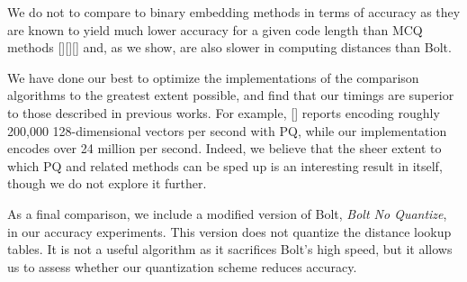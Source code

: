 
We do not to compare to binary embedding methods in terms of accuracy as they are known to yield much lower accuracy for a given code length than MCQ methods [][][] and, as we show, are also slower in computing distances than Bolt. %

We have done our best to optimize the implementations of the comparison algorithms to the greatest extent possible, and find that our timings are superior to those described in previous works. For example, [] reports encoding roughly 200,000 128-dimensional vectors per second with PQ, while our implementation encodes over 24 million per second. Indeed, we believe that the sheer extent to which PQ and related methods can be sped up is an interesting result in itself, though we do not explore it further.

As a final comparison, we include a modified version of Bolt, \textit{Bolt No Quantize}, in our accuracy experiments. This version does not quantize the distance lookup tables. It is not a useful algorithm as it sacrifices Bolt's high speed, but it allows us to assess whether our quantization scheme reduces accuracy.



